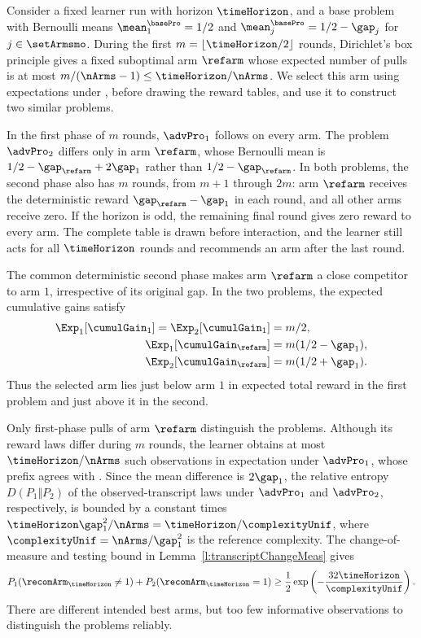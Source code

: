 Consider a fixed learner run with horizon $\timeHorizon$, and a base
problem \basePro{} with Bernoulli means $\mean_1^{\basePro}=1/2$ and
$\mean_j^{\basePro}=1/2-\gap_j$ for $j\in\setArmsmo$.
During the first $m=\lfloor\timeHorizon/2\rfloor$ rounds, Dirichlet's
box principle gives a fixed suboptimal arm $\refarm$ whose expected
number of pulls is at most $m/(\nArms-1)\leq\timeHorizon/\nArms$.
We select this arm using expectations under \basePro{}, before drawing
the reward tables, and use it to construct two similar problems.

In the first phase of $m$ rounds, $\advPro_1$ follows \basePro{} on
every arm. The problem $\advPro_2$ differs only in arm $\refarm$,
whose Bernoulli mean is $1/2-\gap_{\refarm}+2\gap_1$ rather than
$1/2-\gap_{\refarm}$. In both problems, the second phase also has
$m$ rounds, from $m+1$ through $2m$: arm $\refarm$ receives the
deterministic reward $\gap_{\refarm}-\gap_1$ in each round, and
all other arms receive zero. If the horizon is odd, the remaining
final round gives zero reward to every arm. The complete table is
drawn before interaction, and the learner still acts for all
$\timeHorizon$ rounds and recommends an arm after the last round.

The common deterministic second phase makes arm $\refarm$ a close
competitor to arm $1$, irrespective of its original gap. In the two
problems, the expected cumulative gains satisfy
\begin{align*}
\Exp_1[\cumulGain_1]=\Exp_2[\cumulGain_1]&=m/2,\\
\Exp_1[\cumulGain_{\refarm}]&=m(1/2-\gap_1),\\
\Exp_2[\cumulGain_{\refarm}]&=m(1/2+\gap_1).
\end{align*}
Thus the selected arm lies just below arm $1$ in expected total
reward in the first problem and just above it in the second.

Only first-phase pulls of arm $\refarm$ distinguish the problems.
Although its reward laws differ during $m$ rounds, the learner
obtains at most $\timeHorizon/\nArms$ such observations in expectation
under $\advPro_1$, whose prefix agrees with \basePro{}.
Since the mean difference is $2\gap_1$, the relative entropy
$D(P_1\Vert P_2)$ of the observed-transcript laws under $\advPro_1$
and $\advPro_2$, respectively, is bounded by a constant times
$\timeHorizon\gap_1^2/\nArms=\timeHorizon/\complexityUnif$, where
$\complexityUnif=\nArms/\gap_1^2$ is the reference complexity.
The change-of-measure and testing bound in
Lemma~\ref{l:transcriptChangeMeas} gives
\[
P_1(\recomArm_{\timeHorizon}\neq1)
+P_2(\recomArm_{\timeHorizon}=1)
\geq\frac12\exp\left(-\frac{32\timeHorizon}{\complexityUnif}\right).
\]
There are different intended best arms, but too few informative
observations to distinguish the problems reliably.

